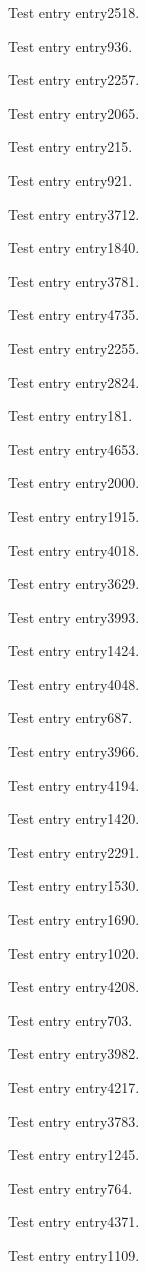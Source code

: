 Test entry \gls{entry2518}.

Test entry \gls{entry936}.

Test entry \gls{entry2257}.

Test entry \gls{entry2065}.

Test entry \gls{entry215}.

Test entry \gls{entry921}.

Test entry \gls{entry3712}.

Test entry \gls{entry1840}.

Test entry \gls{entry3781}.

Test entry \gls{entry4735}.

Test entry \gls{entry2255}.

Test entry \gls{entry2824}.

Test entry \gls{entry181}.

Test entry \gls{entry4653}.

Test entry \gls{entry2000}.

Test entry \gls{entry1915}.

Test entry \gls{entry4018}.

Test entry \gls{entry3629}.

Test entry \gls{entry3993}.

Test entry \gls{entry1424}.

Test entry \gls{entry4048}.

Test entry \gls{entry687}.

Test entry \gls{entry3966}.

Test entry \gls{entry4194}.

Test entry \gls{entry1420}.

Test entry \gls{entry2291}.

Test entry \gls{entry1530}.

Test entry \gls{entry1690}.

Test entry \gls{entry1020}.

Test entry \gls{entry4208}.

Test entry \gls{entry703}.

Test entry \gls{entry3982}.

Test entry \gls{entry4217}.

Test entry \gls{entry3783}.

Test entry \gls{entry1245}.

Test entry \gls{entry764}.

Test entry \gls{entry4371}.

Test entry \gls{entry1109}.

